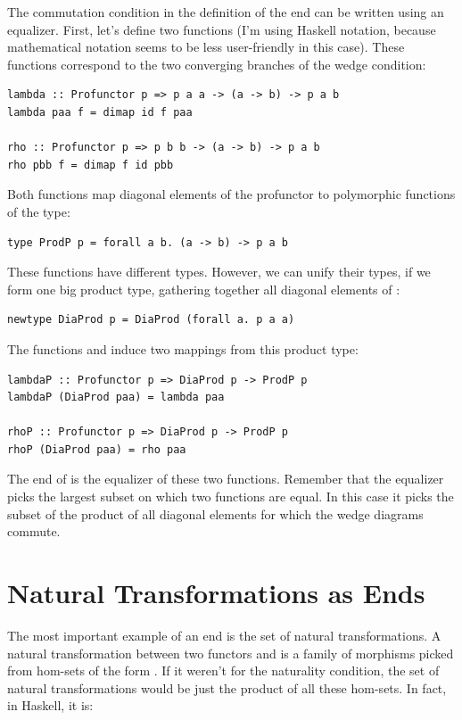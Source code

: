 The commutation condition in the definition of the end can be written
using an equalizer. First, let's define two functions (I'm using Haskell
notation, because mathematical notation seems to be less user-friendly
in this case). These functions correspond to the two converging branches
of the wedge condition:

\begin{verbatim}
lambda :: Profunctor p => p a a -> (a -> b) -> p a b
lambda paa f = dimap id f paa

rho :: Profunctor p => p b b -> (a -> b) -> p a b
rho pbb f = dimap f id pbb
\end{verbatim}
Both functions map diagonal elements of the profunctor  to
polymorphic functions of the type:

\begin{verbatim}
type ProdP p = forall a b. (a -> b) -> p a b
\end{verbatim}
These functions have different types. However, we can unify their types,
if we form one big product type, gathering together all diagonal
elements of :

\begin{verbatim}
newtype DiaProd p = DiaProd (forall a. p a a)
\end{verbatim}
The functions  and  induce two mappings from
this product type:

\begin{verbatim}
lambdaP :: Profunctor p => DiaProd p -> ProdP p
lambdaP (DiaProd paa) = lambda paa

rhoP :: Profunctor p => DiaProd p -> ProdP p
rhoP (DiaProd paa) = rho paa
\end{verbatim}
The end of  is the equalizer of these two functions. Remember
that the equalizer picks the largest subset on which two functions are
equal. In this case it picks the subset of the product of all diagonal
elements for which the wedge diagrams commute.

\section{Natural Transformations as
Ends}\label{natural-transformations-as-ends}

The most important example of an end is the set of natural
transformations. A natural transformation between two functors
 and  is a family of morphisms picked from hom-sets
of the form . If it weren't for the naturality
condition, the set of natural transformations would be just the product
of all these hom-sets. In fact, in Haskell, it is:


